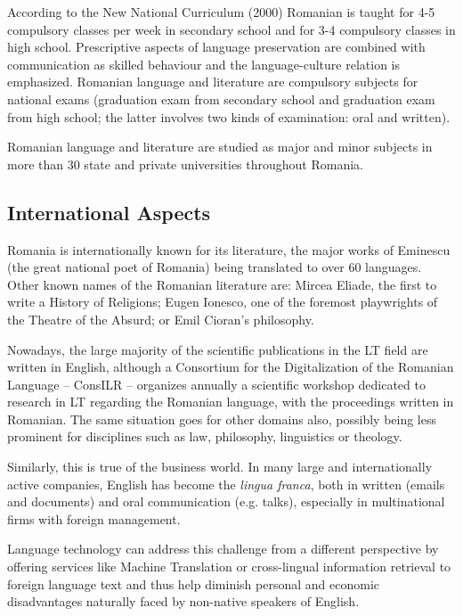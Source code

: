\documentclass[]{../../metanetpaper}
\begin{document}
\begin{multicols}{2}
According to the New National Curriculum (2000) Romanian is taught for 4-5 compulsory classes per week in secondary school and for 3-4 compulsory classes in high school. Prescriptive aspects of language preservation are combined with communication as skilled behaviour and the language-culture relation is emphasized. Romanian language and literature are compulsory subjects for national exams (graduation exam from secondary school and graduation exam from high school; the latter involves two kinds of examination: oral and written).

Romanian language and literature are studied as major and minor subjects in more than 30 state and private universities throughout Romania.

\subsection{International Aspects}

Romania is internationally known for its literature, the major works of Eminescu (the great national poet of Romania) being translated to over 60 languages. Other known names of the Romanian literature are: Mircea Eliade, the first to write a History of Religions; Eugen Ionesco, one of the foremost playwrights of the Theatre of the Absurd; or Emil Cioran’s philosophy. 


Nowadays, the large majority of the scientific publications in the LT field are written in English, although a Consortium for the Digitalization of the Romanian Language – ConsILR – organizes annually a scientific workshop dedicated to research in LT regarding the Romanian language, with the proceedings written in Romanian. The same situation goes for other domains also, possibly being less prominent for disciplines such as law, philosophy, linguistics or theology. 

Similarly, this is true of the business world. In many large and internationally active companies, English has become the \textit{lingua franca}, both in written (emails and documents) and oral communication (e.g. talks), especially in multinational firms with foreign management.

Language technology can address this challenge from a different perspective by offering services like Machine Translation or cross-lingual information retrieval to foreign language text and thus help diminish personal and economic disadvantages naturally faced by non-native speakers of English.


\end{multicols}
\end{document}
